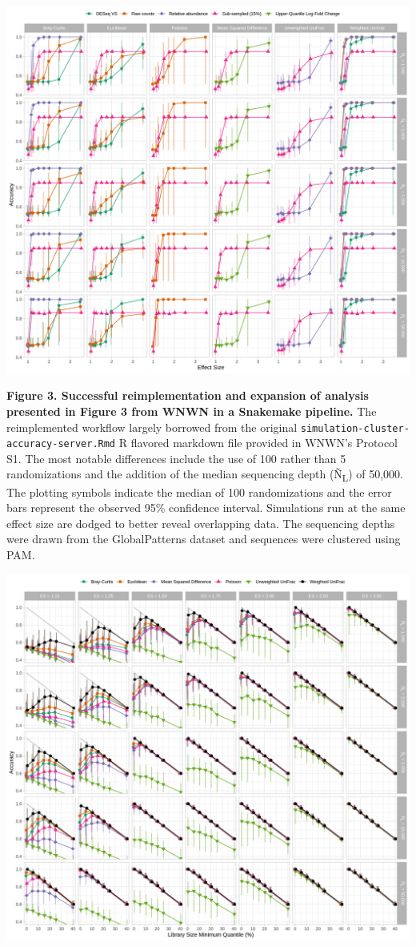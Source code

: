 \documentclass[
]{article}
\begin{document}
\includegraphics{figure_03.png}

\textbf{Figure 3. Successful reimplementation and expansion of analysis
presented in Figure 3 from WNWN in a Snakemake pipeline.} The
reimplemented workflow largely borrowed from the original
\texttt{simulation-cluster-accuracy-server.Rmd} R flavored markdown file
provided in WNWN's Protocol S1. The most notable differences include the
use of 100 rather than 5 randomizations and the addition of the median
sequencing depth (Ñ\textsubscript{L}) of 50,000. The plotting symbols
indicate the median of 100 randomizations and the error bars represent
the observed 95\% confidence interval. Simulations run at the same
effect size are dodged to better reveal overlapping data. The sequencing
depths were drawn from the GlobalPatterns dataset and sequences were
clustered using PAM.

\newpage

\includegraphics{figure_04.png}
\end{document}
